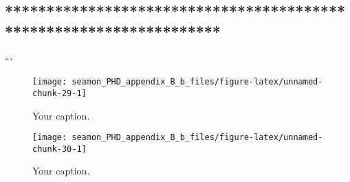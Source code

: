 \documentclass[]{article}
\begin{document}
\hypertarget{section-6}{%
\subsection{*******************************************************************}\label{section-6}}

```

\begin{figure}

{\centering \texttt{[image: seamon\_PHD\_appendix\_B\_b\_files/figure-latex/unnamed-chunk-29-1]} 

}

\caption{Your caption.}\label{fig:unnamed-chunk-29}
\end{figure}

\begin{figure}

{\centering \texttt{[image: seamon\_PHD\_appendix\_B\_b\_files/figure-latex/unnamed-chunk-30-1]} 

}

\caption{Your caption.}\label{fig:unnamed-chunk-30}
\end{figure}
\end{document}
